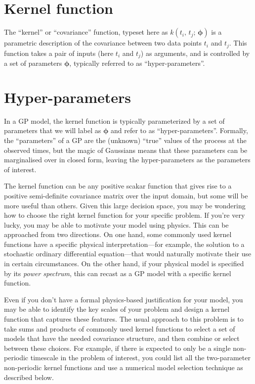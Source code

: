 \documentclass[letterpaper]{ar-1col}
\newcommand{\suz}[1]{\textcolor{magenta}{#1}}
\newcommand{\hyperparams}{\ensuremath{\boldsymbol{\phi}}}
\begin{document}
\begin{textbox}[htb]
  \section{Kernel function}
  The ``kernel'' or ``covariance'' function, typeset here as $k(t_i,\,t_j;\,\hyperparams)$ is a parametric description of the covariance between two data points $t_i$ and $t_j$. This function takes a pair of inputs (here $t_i$ and $t_j$) as arguments, and is controlled by a set of parameters $\hyperparams$, typically referred to as ``hyper-parameters''.

  \vspace{1.5em}

  \section{Hyper-parameters}
  In a GP model, the kernel function is typically parameterized by a set of parameters that we will label as $\hyperparams$ and refer to as ``hyper-parameters''.
  Formally, the ``parameters'' of a GP are the (unknown) ``true'' values of the process at the observed times, but the magic of Gaussians means that these parameters can be marginalised over in closed form, leaving the hyper-parameters as the parameters of interest.
\end{textbox}

The kernel function can be any positive scakar function that gives rise to a positive semi-definite covariance matrix over the input domain, but some will be more useful than others.
Given this large decision space, you may be wondering how to choose the right kernel function for your specific problem.
If you're very lucky, you may be able to motivate your model using physics.
This can be approached from two directions.
On one hand, some commonly used kernel functions have a specific physical interpretation---for example, the solution to a stochastic ordinary differential equation---that would naturally motivate their use in certain circumstances.
On the other hand, if your physical model is specified by its \emph{power spectrum}, this can recast as a GP model with a specific kernel function.

Even if you don't have a formal physics-based justification for your model, you may be able to identify the key scales of your problem and design a kernel function that captures these features.
The usual approach to this problem is to take sums and products of commonly used kernel functions to select a set of  models that have the needed covariance structure, and then combine or select between these choices.
For example, if there is expected to only be a single non-periodic timescale in the problem of interest, you could list all the two-parameter non-periodic kernel functions and use a numerical model selection technique as described below.
\end{document}

